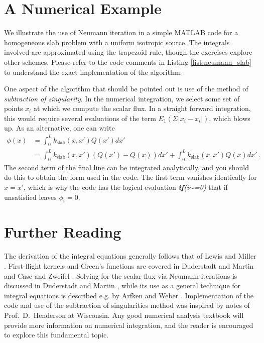 \section*{A Numerical Example}

We illustrate the use of Neumann iteration in a simple MATLAB code for a homogeneous slab problem with a uniform isotropic source.  The integrals involved are approximated using the trapezoid rule, though the exercises explore other schemes.  Please refer to the code comments in Listing \ref{list:neumann_slab} to understand the exact implementation of the algorithm.

One aspect of the algorithm that should be pointed out is use of the method of \textit{subtraction of singularity}.  In the numerical integration, we select some set of points $x_i$ at which we compute the scalar flux.  In a straight forward integration, this would require several evaluations of the term $E_1(\Sigma|x_i-x_i|)$, which blows up.  As an alternative, one can write
\begin{equation}
\begin{split}
  \phi(x) &= \int^L_0 k_{\text{slab}}(x,x') Q(x')dx' \\
          &= \int^L_0 k_{\text{slab}}(x,x') (Q(x')-Q(x))dx' +  \int^L_0 k_{\text{slab}}(x,x') Q(x)dx'  \, .
\end{split}
\end{equation}
The second term of the final line can be integrated analytically, and you should do this to obtain the form used in the code.  The first term vanishes identically for $x=x'$, which is why the code has the logical evaluation \textsl{\textbf{if}(i$\sim$=0)} that if unsatisfied leaves $\phi_i = 0$.




\section*{Further Reading}

The derivation of the integral equations generally follows that of Lewis and Miller \cite{lewis1993cmn}.  First-flight kernels and Green's functions are covered in Duderstadt and Martin \cite{duderstadt1976tt} and Case and Zweifel \cite{case1967ltt}.  Solving for the scalar flux via Neumann iterations is discussed in Duderstadt and Martin \cite{duderstadt1976tt}, while its use as a general technique for integral equations is described e.g. by Arfken and Weber \cite{arfken1995mmp}.  Implementation of the code and use of the subtraction of singularities method was inspired by notes of Prof.~D.~Henderson at Wisconsin. Any good numerical analysis textbook will provide more information on numerical integration, and the reader is encouraged to explore this fundamental topic.    

